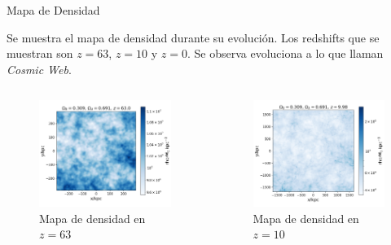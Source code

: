 \documentclass{beamer}
\begin{document}
\begin{frame}{Mapa de Densidad}

	\small Se muestra el mapa de densidad durante su evolución.  Los redshifts que se muestran son $z=63$, $z=10$ y $z=0$. Se observa evoluciona a lo que llaman \textit{Cosmic Web}.

	\begin{columns}[t]

		\begin{column}{0.33\textwidth}
			
			\begin{figure}
				\includegraphics[scale=0.2]{RunCanonica/RunCanonicaZ63.png}
				\caption{\footnotesize Mapa de densidad en $z=63$}
			\end{figure}

		\end{column}

		\begin{column}{0.33\textwidth}
			
			\begin{figure}
				\includegraphics[scale=0.2]{RunCanonica/RunCanonicaZ10.png}
				\caption{\footnotesize Mapa de densidad en $z=10$}
			\end{figure}


\end{column}
\end{columns}
\end{frame}
\end{document}
